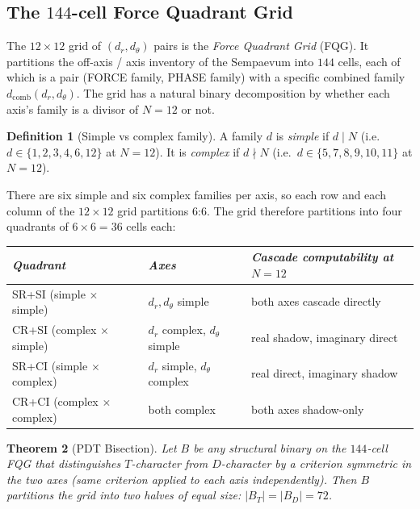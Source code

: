 \documentclass[11pt,a4paper]{article}
\newtheorem{theorem}{Theorem}[section]
\theoremstyle{definition}
\newtheorem{definition}[theorem]{Definition}
\theoremstyle{remark}
\begin{document}
\subsection{The $144$-cell Force Quadrant Grid}\label{subsec:FQG}

The $12\times 12$ grid of $(d_{r}, d_{\theta})$ pairs is the \emph{Force Quadrant Grid} (FQG). It partitions the off-axis / axis inventory of the Sempaevum into $144$ cells, each of which is a pair (FORCE family, PHASE family) with a specific combined family $d_{\text{comb}}(d_{r}, d_{\theta})$. The grid has a natural binary decomposition by whether each axis's family is a divisor of $N=12$ or not.

\begin{definition}[Simple vs complex family]\label{def:simple-complex}
A family $d$ is \emph{simple} if $d \mid N$ (i.e.\ $d\in\{1,2,3,4,6,12\}$ at $N=12$). It is \emph{complex} if $d \nmid N$ (i.e.\ $d\in\{5,7,8,9,10,11\}$ at $N=12$).
\end{definition}

There are six simple and six complex families per axis, so each row and each column of the $12\times 12$ grid partitions $6$:$6$. The grid therefore partitions into four quadrants of $6\times 6 = 36$ cells each:
\begin{center}
\begin{tabular}{@{}lll@{}}
\toprule
\emph{Quadrant} & \emph{Axes} & \emph{Cascade computability at $N=12$} \\
\midrule
SR+SI (simple $\times$ simple) & $d_{r}, d_{\theta}$ simple    & both axes cascade directly \\
CR+SI (complex $\times$ simple) & $d_{r}$ complex, $d_{\theta}$ simple & real shadow, imaginary direct \\
SR+CI (simple $\times$ complex) & $d_{r}$ simple, $d_{\theta}$ complex & real direct, imaginary shadow \\
CR+CI (complex $\times$ complex) & both complex                 & both axes shadow-only \\
\bottomrule
\end{tabular}
\end{center}

\begin{theorem}[PDT Bisection]\label{thm:pdt-bisection}
Let $B$ be any structural binary on the $144$-cell FQG that distinguishes $T$-character from $D$-character by a criterion symmetric in the two axes (same criterion applied to each axis independently). Then $B$ partitions the grid into two halves of equal size: $|B_{T}| = |B_{D}| = 72$.
\end{theorem}
\end{document}
